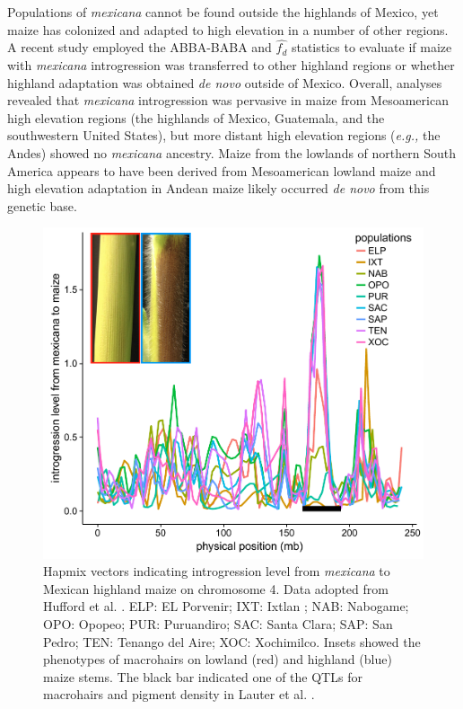 \documentclass[11pt]{article}
\begin{document}
\begin{enumerate}
Populations of \emph{mexicana} cannot be found outside the highlands of Mexico, yet maize has colonized and adapted to high elevation in a number of other regions.
A recent study \cite{wang2017} employed the ABBA-BABA and $\hat{f_{d}}$ statistics to evaluate if maize with \emph{mexicana} introgression was transferred to other highland regions or whether highland adaptation was obtained \emph{de novo} outside of Mexico.
Overall, analyses revealed that  \emph{mexicana} introgression was pervasive in maize from Mesoamerican high elevation regions (the highlands of Mexico, Guatemala, and the southwestern United States), but more distant high elevation regions (\emph{e.g.,} the Andes) showed no \emph{mexicana} ancestry.
Maize from the lowlands of northern South America appears to have been derived from Mesoamerican lowland maize and high elevation adaptation in Andean maize likely occurred \emph{de novo} from this genetic base.


\begin{figure}[b]
	\centering
	\includegraphics[width=17.35cm]{./FigsAndTables/Figure1new}
	\caption{Hapmix vectors indicating introgression level from \emph{mexicana} to Mexican highland maize on chromosome 4. Data adopted from Hufford et al. \cite{Hufford2013}. ELP: EL Porvenir; IXT: Ixtlan ; NAB: Nabogame; OPO: Opopeo; PUR: Puruandiro; SAC: Santa Clara; SAP: San Pedro; TEN: Tenango del Aire; XOC: Xochimilco. Insets showed the phenotypes of macrohairs on lowland (red) and highland (blue) maize stems. The black bar indicated one of the QTLs for macrohairs and pigment density in Lauter et al. \cite{lauter2004}.}
	\label{fig:introgressionMaize}
\end{figure}





\end{enumerate}
\end{document}
